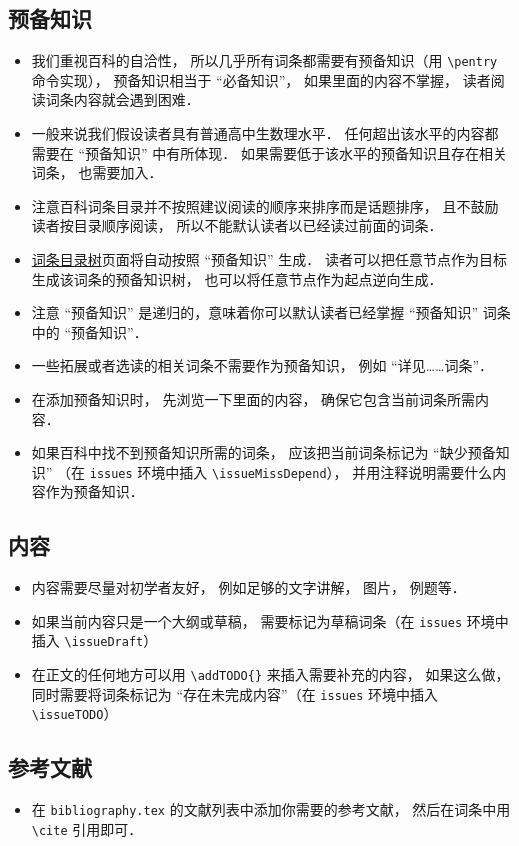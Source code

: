 
\begin{issues}
\issueTODO
\end{issues}

\subsection{预备知识}
\begin{itemize}
\item 我们重视百科的自洽性， 所以几乎所有词条都需要有预备知识（用 \verb|\pentry| 命令实现）， 预备知识相当于 “必备知识”， 如果里面的内容不掌握， 读者阅读词条内容就会遇到困难．
\item 一般来说我们假设读者具有普通高中生数理水平． 任何超出该水平的内容都需要在 “预备知识” 中有所体现． 如果需要低于该水平的预备知识且存在相关词条， 也需要加入．
\item 注意百科词条目录并不按照建议阅读的顺序来排序而是话题排序， 且不鼓励读者按目录顺序阅读， 所以不能默认读者以已经读过前面的词条．
\item \href{http://wuli.wiki/tree/}{词条目录树}页面将自动按照 “预备知识” 生成． 读者可以把任意节点作为目标生成该词条的预备知识树， 也可以将任意节点作为起点逆向生成．
\item 注意 “预备知识” 是递归的，意味着你可以默认读者已经掌握 “预备知识” 词条中的 “预备知识”．
\item 一些拓展或者选读的相关词条不需要作为预备知识， 例如 “详见……词条”．
\item 在添加预备知识时， 先浏览一下里面的内容， 确保它包含当前词条所需内容．
\item 如果百科中找不到预备知识所需的词条， 应该把当前词条标记为 “缺少预备知识” （在 \verb|issues| 环境中插入 \verb|\issueMissDepend|）， 并用注释说明需要什么内容作为预备知识．
\end{itemize}

\subsection{内容}
\begin{itemize}
\item 内容需要尽量对初学者友好， 例如足够的文字讲解， 图片， 例题等．
\item 如果当前内容只是一个大纲或草稿， 需要标记为草稿词条（在 \verb|issues| 环境中插入 \verb|\issueDraft|）
\item 在正文的任何地方可以用 \verb|\addTODO{}| 来插入需要补充的内容， 如果这么做， 同时需要将词条标记为 “存在未完成内容”（在 \verb|issues| 环境中插入 \verb|\issueTODO|）
\end{itemize}

\subsection{参考文献}
\begin{itemize}
\item 在 \verb|bibliography.tex| 的文献列表中添加你需要的参考文献， 然后在词条中用 \verb|\cite| 引用即可．
\end{itemize}

